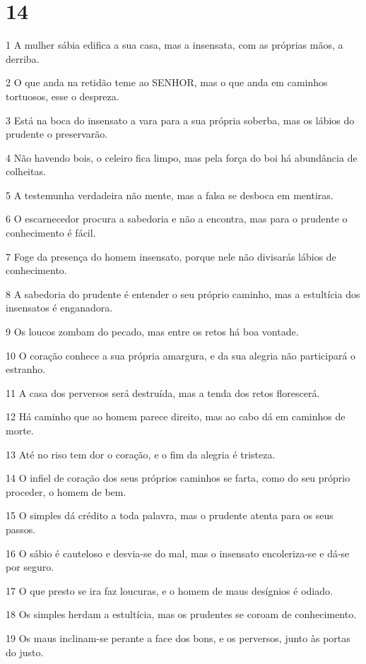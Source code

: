 \chapter{14}

\par 1 A mulher sábia edifica a sua casa, mas a insensata, com as próprias mãos, a derriba.
\par 2 O que anda na retidão teme ao SENHOR, mas o que anda em caminhos tortuosos, esse o despreza.
\par 3 Está na boca do insensato a vara para a sua própria soberba, mas os lábios do prudente o preservarão.
\par 4 Não havendo bois, o celeiro fica limpo, mas pela força do boi há abundância de colheitas.
\par 5 A testemunha verdadeira não mente, mas a falsa se desboca em mentiras.
\par 6 O escarnecedor procura a sabedoria e não a encontra, mas para o prudente o conhecimento é fácil.
\par 7 Foge da presença do homem insensato, porque nele não divisarás lábios de conhecimento.
\par 8 A sabedoria do prudente é entender o seu próprio caminho, mas a estultícia dos insensatos é enganadora.
\par 9 Os loucos zombam do pecado, mas entre os retos há boa vontade.
\par 10 O coração conhece a sua própria amargura, e da sua alegria não participará o estranho.
\par 11 A casa dos perversos será destruída, mas a tenda dos retos florescerá.
\par 12 Há caminho que ao homem parece direito, mas ao cabo dá em caminhos de morte.
\par 13 Até no riso tem dor o coração, e o fim da alegria é tristeza.
\par 14 O infiel de coração dos seus próprios caminhos se farta, como do seu próprio proceder, o homem de bem.
\par 15 O simples dá crédito a toda palavra, mas o prudente atenta para os seus passos.
\par 16 O sábio é cauteloso e desvia-se do mal, mas o insensato encoleriza-se e dá-se por seguro.
\par 17 O que presto se ira faz loucuras, e o homem de maus desígnios é odiado.
\par 18 Os simples herdam a estultícia, mas os prudentes se coroam de conhecimento.
\par 19 Os maus inclinam-se perante a face dos bons, e os perversos, junto às portas do justo.
